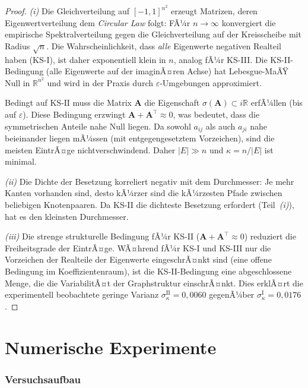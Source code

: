 ﻿\documentclass[12pt, a4paper, titlepage]{report}
\theoremstyle{definition}
\theoremstyle{remark}
\newcommand{\R}{\mathbb{R}}
\newcommand{\vA}{\bm{A}}
\newcommand{\T}{\top}
\newcommand{\spec}{\sigma}
\newcommand{\KS}{\mathrm{KS}}
\begin{document}
\begin{proof}
\textit{(i)} Die Gleichverteilung auf $[-1,1]^{n^2}$ erzeugt Matrizen, deren
Eigenwertverteilung dem \emph{Circular Law} folgt: FÃ¼r $n \to \infty$ konvergiert
die empirische Spektralverteilung gegen die Gleichverteilung auf der Kreisscheibe
mit Radius $\sqrt{n}$. Die Wahrscheinlichkeit, dass \emph{alle} Eigenwerte
negativen Realteil haben (KS-I), ist daher exponentiell klein in $n$, analog
fÃ¼r KS-III. Die KS-II-Bedingung (alle Eigenwerte auf der imaginÃ¤ren Achse) hat
Lebesgue-MaÃŸ Null in $\R^{n^2}$ und wird in der Praxis durch $\varepsilon$-Umgebungen
approximiert.

Bedingt auf $\KS\text{-II}$ muss die Matrix $\vA$ die Eigenschaft
$\spec(\vA) \subset i\R$ erfÃ¼llen (bis auf $\varepsilon$). Diese Bedingung erzwingt
$\vA + \vA^\T \approx 0$, was bedeutet, dass die symmetrischen Anteile nahe Null
liegen. Da sowohl $a_{ij}$ als auch $a_{ji}$ nahe beieinander liegen mÃ¼ssen
(mit entgegengesetztem Vorzeichen), sind die meisten EintrÃ¤ge nichtverschwindend.
Daher $|E| \gg n$ und $\kappa = n/|E|$ ist minimal.

\textit{(ii)} Die Dichte der Besetzung korreliert negativ mit dem Durchmesser:
Je mehr Kanten vorhanden sind, desto kÃ¼rzer sind die kÃ¼rzesten Pfade zwischen
beliebigen Knotenpaaren. Da KS-II die dichteste Besetzung erfordert
(Teil~\textit{(i)}), hat es den kleinsten Durchmesser.

\textit{(iii)} Die strenge strukturelle Bedingung fÃ¼r KS-II ($\vA + \vA^\T \approx 0$)
reduziert die Freiheitsgrade der EintrÃ¤ge. WÃ¤hrend fÃ¼r KS-I und KS-III nur die
Vorzeichen der Realteile der Eigenwerte eingeschrÃ¤nkt sind (eine offene Bedingung im
Koeffizientenraum), ist die KS-II-Bedingung eine abgeschlossene Menge, die die
VariabilitÃ¤t der Graphstruktur einschrÃ¤nkt. Dies erklÃ¤rt die experimentell beobachtete
geringe Varianz $\sigma_\kappa^{\mathrm{II}} = 0{,}0060$ gegenÃ¼ber
$\sigma_\kappa^{\mathrm{I}} = 0{,}0176$.
\end{proof}

\section{Numerische Experimente}

\subsubsection{Versuchsaufbau}
\end{document}
